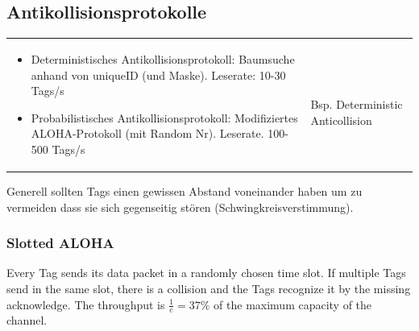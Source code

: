 \subsection{Antikollisionsprotokolle}
	\begin{tabular}{ll}
		\parbox{9cm}{
			\begin{itemize}
				 \item Deterministisches Antikollisionsprotokoll: Baumsuche anhand von uniqueID (und Maske). Leserate: 10-30 Tags/s
				 
				 \item Probabilistisches Antikollisionsprotokoll: Modifiziertes ALOHA-Protokoll (mit Random Nr). Leserate. 100-500 Tags/s
			\end{itemize}
		}	
		& \parbox{9cm}{
			\\ Bsp. Deterministic Anticollision
		}
	\end{tabular}
	
	Generell sollten Tags einen gewissen Abstand voneinander haben um zu vermeiden dass sie sich gegenseitig stören (Schwingkreisverstimmung).

\subsubsection{Slotted ALOHA}
\label{sec:slotted-aloha}
	Every Tag sends its data packet in a randomly chosen time slot. If multiple Tags send in the same slot, there is a collision and the Tags
	recognize it by the missing acknowledge. The throughput is $\frac{1}{e} = 37\%$ of the maximum capacity of the channel.
	

